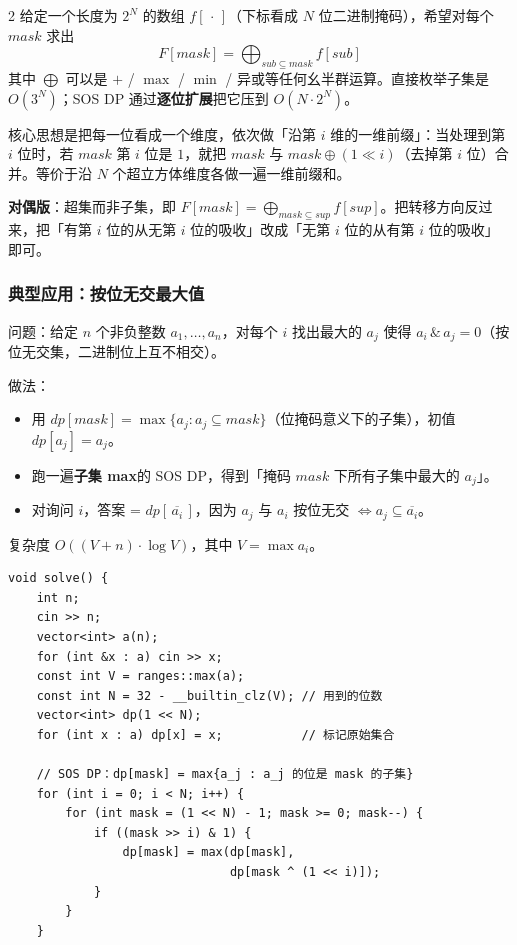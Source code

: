 \begin{multicols*}{2}
		给定一个长度为 $2^N$ 的数组 $f[\,\cdot\,]$（下标看成 $N$ 位二进制掩码），希望对每个 $mask$ 求出
		$$F[mask] = \bigoplus_{sub \subseteq mask} f[sub]$$
		其中 $\bigoplus$ 可以是 $+$ / $\max$ / $\min$ / 异或等任何幺半群运算。直接枚举子集是 $O(3^N)$；SOS DP 通过\textbf{逐位扩展}把它压到 $O(N \cdot 2^N)$。

		核心思想是把每一位看成一个维度，依次做「沿第 $i$ 维的一维前缀」：当处理到第 $i$ 位时，若 $mask$ 第 $i$ 位是 $1$，就把 $mask$ 与 $mask \oplus (1 \!\ll\! i)$（去掉第 $i$ 位）合并。等价于沿 $N$ 个超立方体维度各做一遍一维前缀和。

		\textbf{对偶版}：超集而非子集，即 $F[mask] = \bigoplus_{mask \subseteq sup} f[sup]$。把转移方向反过来，把「有第 $i$ 位的从无第 $i$ 位的吸收」改成「无第 $i$ 位的从有第 $i$ 位的吸收」即可。

		\subsubsection{典型应用：按位无交最大值}

		问题：给定 $n$ 个非负整数 $a_1, \dots, a_n$，对每个 $i$ 找出最大的 $a_j$ 使得 $a_i \,\&\, a_j = 0$（按位无交集，二进制位上互不相交）。

		做法：
		\begin{itemize}
			\item 用 $dp[mask] = \max\{a_j : a_j \subseteq mask\}$（位掩码意义下的子集），初值 $dp[a_j] = a_j$。
			\item 跑一遍\textbf{子集 max}的 SOS DP，得到「掩码 $mask$ 下所有子集中最大的 $a_j$」。
			\item 对询问 $i$，答案 = $dp[\,\overline{a_i}\,]$，因为 $a_j$ 与 $a_i$ 按位无交 $\iff a_j \subseteq \overline{a_i}$。
		\end{itemize}

		复杂度 $O((V + n) \cdot \log V)$，其中 $V = \max a_i$。

		\begin{verbatim}
void solve() {
	int n;
	cin >> n;
	vector<int> a(n);
	for (int &x : a) cin >> x;
	const int V = ranges::max(a);
	const int N = 32 - __builtin_clz(V); // 用到的位数
	vector<int> dp(1 << N);
	for (int x : a) dp[x] = x;           // 标记原始集合

	// SOS DP：dp[mask] = max{a_j : a_j 的位是 mask 的子集}
	for (int i = 0; i < N; i++) {
		for (int mask = (1 << N) - 1; mask >= 0; mask--) {
			if ((mask >> i) & 1) {
				dp[mask] = max(dp[mask],
				               dp[mask ^ (1 << i)]);
			}
		}
	}


\end{verbatim}
\end{multicols*}
